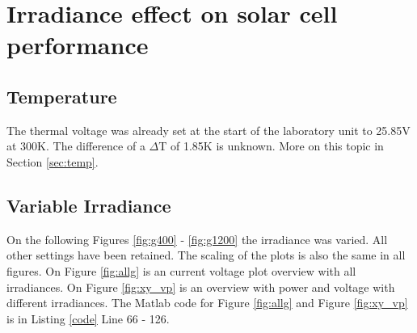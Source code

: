 	

\newpage
\section{Irradiance effect on solar cell performance} \label{sec:irra}

	\subsection{Temperature}
	The thermal voltage was already set at the start of the laboratory unit to 25.85V at 300K. The difference of a $\Delta$T of 1.85K is unknown. More on this topic in Section \ref{sec:temp}.
	
	\subsection{Variable Irradiance}
	On the following Figures \ref{fig:g400} - \ref{fig:g1200} the irradiance was varied. All other settings have been retained. The scaling of the plots is also the same in all figures.
	On Figure \ref{fig:allg} is an current voltage plot overview with all irradiances. On Figure \ref{fig:xy_vp} is an overview with power and voltage with different irradiances. The Matlab code for Figure \ref{fig:allg} and Figure \ref{fig:xy_vp} is in Listing \ref{code} Line 66 - 126.
		
